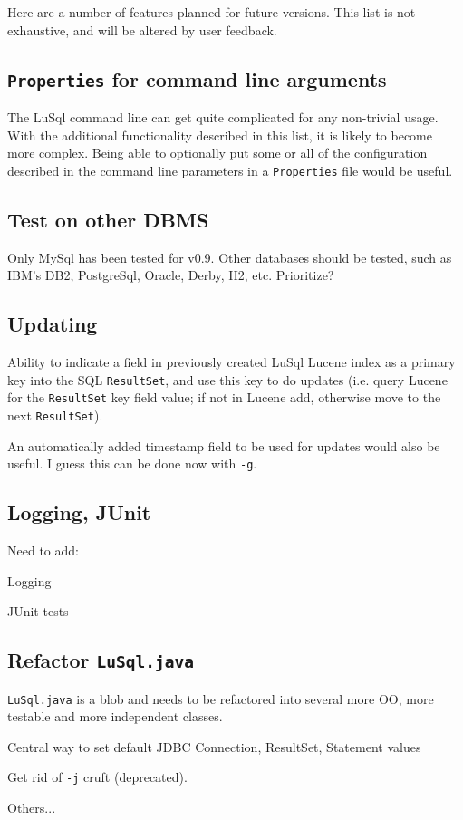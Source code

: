 \label{todo}
Here are a number of features planned for future versions.
This list is not exhaustive, and will be altered by user feedback.

\subsection{{\tt Properties} for command line arguments}
The LuSql command line can get quite complicated for any non-trivial usage.
With the additional functionality described in this list, it is likely to
become more complex. 
Being able to optionally put some or all of the configuration
described in the command line parameters in a {\tt Properties} file would be
useful. 

\subsection{Test on other DBMS}
Only MySql has been tested for v0.9.
Other databases should be tested, such as IBM's 
DB2, PostgreSql, Oracle, Derby, H2, etc.
Prioritize?

\subsection{Updating}
\begin{mlist}
\item Ability to indicate a field in previously created LuSql Lucene index as a
primary key into the SQL {\tt ResultSet}, and use this key to do updates (i.e. query
Lucene for the {\tt ResultSet} key field value; if not in Lucene add, otherwise move
to the next {\tt ResultSet}).

\item An automatically added timestamp field to be used for updates would also
  be useful. 
  I guess this can be done now with {\tt -g}.
\end{mlist}




\subsection{Logging, JUnit}
Need to add:
\begin{mlist}
\item Logging
\item JUnit tests
\end{mlist}

\subsection{Refactor {\tt LuSql.java}}
{\tt LuSql.java} is a blob and needs to be refactored into several more OO,
more testable and more independent classes.
\begin{mlist}
\item Central way to set default JDBC Connection, ResultSet, Statement values
\item Get rid of {\tt -j} cruft (deprecated).
\item Others...
\end{mlist}

